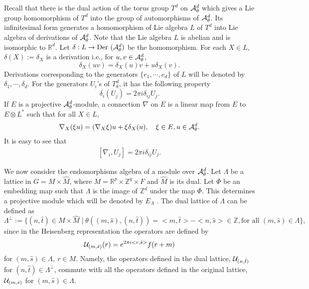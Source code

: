 \documentclass[12pt, a4paper]{article}
\newcommand{\Z}{{\mathbb Z}}
\newcommand{\R}{{\mathbb R}}
\begin{document}
 Recall that there is the dual action of
the torus group $T^d$ on ${\cal A}_\theta^d$ which gives a Lie
group homomorphism of $T^d$ into the group of automorphisms of
${\cal A}_\theta^d$. Its infinitesimal form generates a
homomorphism of Lie algebra $ L$ of $T^d$ into Lie algebra of
derivations of ${\cal A}_\theta^d$. Note that the Lie algebra $L$
is abelian and is isomorphic to ${\R}^d$. Let $\delta:L\rightarrow
{\rm {Der \ }}({\cal A}_\theta^d)$ be the homomorphism. For each
$X\in L$, $\delta(X):=\delta_X$ is a derivation i.e., for $u,v\in
{\cal A}_\theta^d$,
\begin{equation} \label{derv1}
\delta_X(uv)=\delta_X(u)v+u\delta_X(v).
\end{equation}
Derivations corresponding to the generators $\{e_1,\cdots,e_d\}$
of $L$ will be denoted by $\delta_1,\cdots,\delta_d$. For the
generators $U_i$'s of $T_\theta^d$, it has the following property
\begin{equation} \label{derv2}
\delta_i(U_j)=2\pi i\delta_{ij} U_j.
\end{equation}
If $E$ is a projective ${\cal A}_\theta^d$-module, a connection
$\nabla$ on $E$ is a linear map from $E$ to $E\otimes L^*$ such
that for all $X\in L$,
\begin{align} \label{conn1}
\nabla_X(\xi u)=(\nabla_X\xi)u+\xi\delta_X(u),{\rm { \ \ \
}}\xi\in {E}, u\in {\cal A}_\theta^d.
\end{align}
It is easy to see that
\begin{align} \label{conn2}
[\nabla_i,U_j]=2\pi i\delta_{ij} U_j.
\end{align}

We now consider the endomorphisms algebra of a module over ${\cal
A}_\theta^d$. Let $\Lambda$ be a lattice in $G=M\times
\widehat{M}$, where $M={\R}^p\times{\Z}^q\times F$ and
$\widehat{M}$ is its dual. Let $\Phi$ be an embedding map such
that $\Lambda$ is the image of ${\Z}^d$ under the map $\Phi$. This
determines a projective module which will be denoted by
${E}_\Lambda$ \cite{rief88}. The dual lattice of $\Lambda$ can be
defined as
%
\begin{equation}\label{dual}
\Lambda^\perp:=\{(n,\hat t)\in M\times \widehat{M}\mid
\theta((m,\hat s),(n,\hat t))=<m, \hat t>-<n, \hat s> \in{\Z},
\text{for all }(m,\hat s)\in \Lambda\},
\end{equation}
since in the Heisenberg representation the operators are
 defined by
\begin{equation}\label{pirep}
{\cal U}_{(m,\hat s)}(r)=e^{2\pi i <r, \hat s>}f(r+m)
\end{equation}
for $(m,\hat s)\in\Lambda, \ r \in M .$ Namely, the operators
defined in the dual lattice, ${\cal U}_{(n,\hat t)}$ for $(n,\hat
t)\in\Lambda^\perp$, commute with all the operators defined in the
original lattice, ${\cal U}_{(m,\hat s)}$ for $(m,\hat
s)\in\Lambda$.
\end{document}
